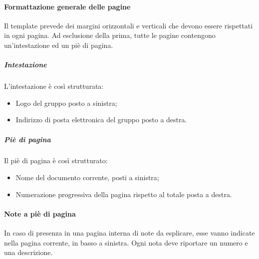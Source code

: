 		\paragraph{Formattazione generale delle pagine} \Spazio
		Il template prevede dei margini orizzontali e verticali che devono essere rispettati in ogni pagina. Ad esclusione della prima, tutte le pagine contengono un’intestazione ed un piè di pagina. 
			
			\subparagraph{Intestazione} \Spazio
			L’intestazione è così strutturata:
			\begin{itemize}
				\item Logo del gruppo posto a sinistra;
				\item Indirizzo di posta elettronica del gruppo posto a destra.
			\end{itemize}
			
			\subparagraph{Piè di pagina} \Spazio
			Il piè di pagina è così strutturato:
			\begin{itemize}
				\item Nome del documento corrente, posti a sinistra;
				\item Numerazione progressiva della pagina rispetto al totale posta a destra.
			\end{itemize}
		
		\paragraph{Note a piè di pagina} \Spazio
		In caso di presenza in una pagina interna di note da esplicare, esse vanno indicate nella pagina corrente, in basso a sinistra. Ogni nota deve riportare un numero e una	descrizione.
		
